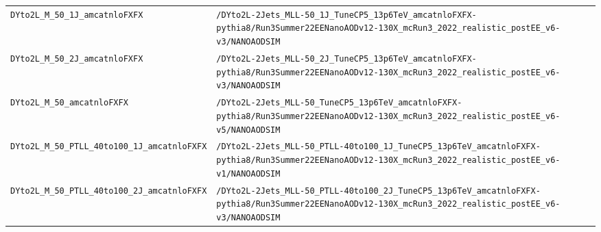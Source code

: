 \begin{longtable}{@{}>{\RaggedRight\arraybackslash}p{} >{\RaggedRight\arraybackslash}p{}@{}}
\texttt{DYto2L\_\allowbreak{}M\_\allowbreak{}50\_\allowbreak{}1J\_\allowbreak{}amcatnloFXFX} & \texttt{/\allowbreak{}DYto2L-\allowbreak{}2Jets\_\allowbreak{}MLL-\allowbreak{}50\_\allowbreak{}1J\_\allowbreak{}TuneCP5\_\allowbreak{}13p6TeV\_\allowbreak{}amcatnloFXFX-\allowbreak{}pythia8/\allowbreak{}Run3Summer22EENanoAODv12-\allowbreak{}130X\_\allowbreak{}mcRun3\_\allowbreak{}2022\_\allowbreak{}realistic\_\allowbreak{}postEE\_\allowbreak{}v6-\allowbreak{}v3/\allowbreak{}NANOAODSIM} \\
\addlinespace[2pt]
\texttt{DYto2L\_\allowbreak{}M\_\allowbreak{}50\_\allowbreak{}2J\_\allowbreak{}amcatnloFXFX} & \texttt{/\allowbreak{}DYto2L-\allowbreak{}2Jets\_\allowbreak{}MLL-\allowbreak{}50\_\allowbreak{}2J\_\allowbreak{}TuneCP5\_\allowbreak{}13p6TeV\_\allowbreak{}amcatnloFXFX-\allowbreak{}pythia8/\allowbreak{}Run3Summer22EENanoAODv12-\allowbreak{}130X\_\allowbreak{}mcRun3\_\allowbreak{}2022\_\allowbreak{}realistic\_\allowbreak{}postEE\_\allowbreak{}v6-\allowbreak{}v3/\allowbreak{}NANOAODSIM} \\
\addlinespace[2pt]
\texttt{DYto2L\_\allowbreak{}M\_\allowbreak{}50\_\allowbreak{}amcatnloFXFX} & \texttt{/\allowbreak{}DYto2L-\allowbreak{}2Jets\_\allowbreak{}MLL-\allowbreak{}50\_\allowbreak{}TuneCP5\_\allowbreak{}13p6TeV\_\allowbreak{}amcatnloFXFX-\allowbreak{}pythia8/\allowbreak{}Run3Summer22EENanoAODv12-\allowbreak{}130X\_\allowbreak{}mcRun3\_\allowbreak{}2022\_\allowbreak{}realistic\_\allowbreak{}postEE\_\allowbreak{}v6-\allowbreak{}v5/\allowbreak{}NANOAODSIM} \\
\addlinespace[2pt]
\texttt{DYto2L\_\allowbreak{}M\_\allowbreak{}50\_\allowbreak{}PTLL\_\allowbreak{}40to100\_\allowbreak{}1J\_\allowbreak{}amcatnloFXFX} & \texttt{/\allowbreak{}DYto2L-\allowbreak{}2Jets\_\allowbreak{}MLL-\allowbreak{}50\_\allowbreak{}PTLL-\allowbreak{}40to100\_\allowbreak{}1J\_\allowbreak{}TuneCP5\_\allowbreak{}13p6TeV\_\allowbreak{}amcatnloFXFX-\allowbreak{}pythia8/\allowbreak{}Run3Summer22EENanoAODv12-\allowbreak{}130X\_\allowbreak{}mcRun3\_\allowbreak{}2022\_\allowbreak{}realistic\_\allowbreak{}postEE\_\allowbreak{}v6-\allowbreak{}v1/\allowbreak{}NANOAODSIM} \\
\addlinespace[2pt]
\texttt{DYto2L\_\allowbreak{}M\_\allowbreak{}50\_\allowbreak{}PTLL\_\allowbreak{}40to100\_\allowbreak{}2J\_\allowbreak{}amcatnloFXFX} & \texttt{/\allowbreak{}DYto2L-\allowbreak{}2Jets\_\allowbreak{}MLL-\allowbreak{}50\_\allowbreak{}PTLL-\allowbreak{}40to100\_\allowbreak{}2J\_\allowbreak{}TuneCP5\_\allowbreak{}13p6TeV\_\allowbreak{}amcatnloFXFX-\allowbreak{}pythia8/\allowbreak{}Run3Summer22EENanoAODv12-\allowbreak{}130X\_\allowbreak{}mcRun3\_\allowbreak{}2022\_\allowbreak{}realistic\_\allowbreak{}postEE\_\allowbreak{}v6-\allowbreak{}v3/\allowbreak{}NANOAODSIM} \\

\end{longtable}

